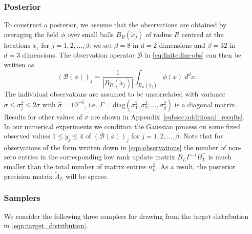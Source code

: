 \documentclass[11pt,english]{article}
\theoremstyle{plain}
\theoremstyle{plain}
\theoremstyle{plain}
\theoremstyle{plain}
\numberwithin{equation}{section}
\newcommand{\rev}[1]{#1}
\begin{document}
\subsubsection{Posterior}\label{sec:posterior}
To construct a posterior, we assume that the observations are obtained by averaging the field $\phi$ over small balls $B_R(\mathring{x}_j)$ of radius $R$ centred at the locations $\mathring{x}_j$ for $j=1,2,\dots,\beta$; we set $\beta=8$ in $d=2$ dimensions and $\beta=32$ in $d=3$ dimensions. The observation operator $\mathcal{B}$ in \eqref{eq:finitedim-obs} can then be written as
\begin{equation}
    \left(\mathcal{B}(\phi)\right)_j = \frac{1}{|B_R(\mathring{x}_j)|} \int_{B_R(\mathring{x}_j)} \phi(x)\;d^dx.
    \label{eqn:observations}
\end{equation}
The individual observations are assumed to be uncorrelated with variance \rev{$\widehat{\sigma}\le \sigma_j^2\le 2\widehat{\sigma}$ with $\widehat{\sigma}=10^{-6}$}, i.e. $\Gamma=\text{diag}(\sigma_1^2,\sigma_2^2,\dots,\sigma_\beta^2)$ is a diagonal matrix. \rev{Results for other values of $\widehat{\sigma}$ are shown in Appendix~\ref{subsec:additional_results}}. In our numerical experiments we condition the Gaussian process on some fixed observed values $1\le \mathring{y}_j\le 4$ of $\left(\mathcal{B}(\phi)\right)_j$  for $j=1,2,\dots,\beta$.
Note that for observations of the form written down in \eqref{eqn:observations} the number of non-zero entries in the corresponding low rank update matrix $B_L\Gamma^{-1} B_L^\top$ is much smaller than the total number of matrix entries $n_L^2$. As a result, the posterior precision matrix $\widetilde{A}_L$ will be sparse.
\subsubsection{Samplers}\label{sec:samplers}
We consider the following three samplers for drawing from the target distribution in \eqref{eqn:target_distribution}.
\end{document}

